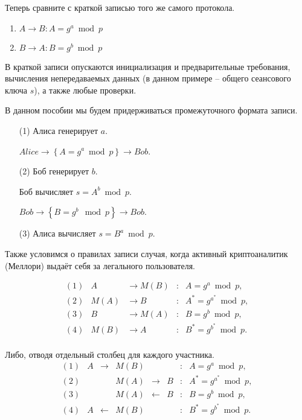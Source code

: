 Теперь сравните с краткой записью того же самого протокола.
\begin{enumerate}
	\item $A \to B : A = g^a \bmod p$
	\item $B \to A : B = g^b \bmod p$
\end{enumerate}

В краткой записи опускаются инициализация и предварительные требования, вычисления непередаваемых данных (в данном примере -- общего сеансового ключа $s$), а также любые проверки.

В данном пособии мы будем придерживаться промежуточного формата записи.

\begin{enumerate}
	\item[(1)] Алиса генерирует $a$.
	\item[] $Alice \to \left\{ A = g^a \bmod p \right\} \to Bob$.
	\item[(2)] Боб генерирует $b$.
	\item[] Боб вычисляет $s = A^b \bmod p$.
	\item[] $Bob \to \left\{ B = g^b \mod p \right\} \to Bob$.
	\item[(3)] Алиса вычисляет $s = B^a \bmod p$.
\end{enumerate}

Также условимся о правилах записи случая, когда активный криптоаналитик (Меллори) выдаёт себя за легального пользователя.

\[
\begin{array}{llllc}
(1) & A                & \to M \left(B\right) & : & A   = g^a     \bmod p, \\ 
(2) & M \left(A\right) & \to B                & : & A^* = g^{a^*} \bmod p, \\ 
(3) & B                & \to M \left(A\right) & : & B   = g^b     \bmod p, \\ 
(4) & M \left(B\right) & \to A                & : & B^* = g^{b^*} \bmod p. \\
\end{array}
\]

Либо, отводя отдельный столбец для каждого участника.
\[
\begin{array}{lllclllc}
	(1) & A  & \to   & M \left(B\right) & {}    & {} & : & A = g^a     \bmod p, \\ 
	(2) & {} & {}    & M \left(A\right) & \to   & B  & : & A^* = g^{a^*} \bmod p, \\ 
	(3) & {} & {}    & M \left(A\right) & \gets & B  & : & B   = g^b     \bmod p, \\ 
	(4) & A  & \gets & M \left(B\right) & {}    & {} & : & B^* = g^{b^*} \bmod p. \\
\end{array}
\]

